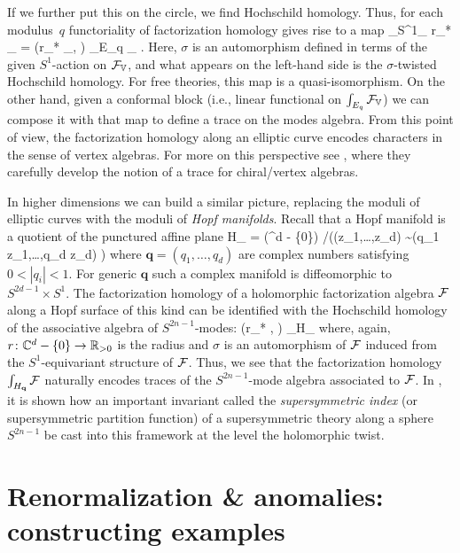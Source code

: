 \documentclass[11pt]{amsart}
\renewcommand{\op}{\operatorname}
\begin{document}
If we further put this on the circle, we find Hochschild homology.
Thus, for each modulus~$q$ functoriality of factorization homology gives rise to a map
\beqn
\int_{S^1_{\sigma}} r_* \cF_{} = \op{Hoch}(r_* \cF_{}, \sigma) \to \int_{E_q} \cF_{} .
\eeqn
Here, $\sigma$ is an automorphism defined in terms of the given $S^1$-action on $\mathcal F_{\mathbb{V}}$, and what appears on the left-hand side is the $\sigma$-twisted Hochschild homology.
For free theories, this map is a quasi-isomorphism.
On the other hand, given a conformal block (i.e., linear functional on $\int_{E_q} \mathcal F_{\mathbb{V}}$) we can compose it with that map to define a trace on the modes algebra.
From this point of view, the factorization homology along an elliptic curve encodes characters in the sense of vertex algebras.
For more on this perspective see \cite{GuiLi}, where they carefully develop the notion of a trace for chiral/vertex algebras.

In higher dimensions we can build a similar picture,
replacing the moduli of elliptic curves with the moduli of {\it Hopf manifolds}.
Recall that a Hopf manifold is a quotient of the punctured affine plane
\beqn
H_{} = \left(\C^d - \{0\}\right) \slash \left((z_1,\ldots,z_d) \sim (q_1 z_1,\ldots,q_d z_d) \right)
\eeqn
where $\mathbf{q} = (q_1,\ldots,q_d)$ are complex numbers satisfying $0 < |q_i| < 1$.
For generic $\mathbf{q}$ such a complex manifold is diffeomorphic to $S^{2d-1} \times S^1$.
The factorization homology of a holomorphic factorization algebra $\mathcal F$ along a Hopf surface of this kind can be identified with the Hochschild homology of the associative algebra of $S^{2n-1}$-modes:
\beqn
\op{Hoch}(r_* \cF , \sigma) \to \int_{H_{}} \cF 
\eeqn
where, again, $r\colon {\mathbb{C}}^d - \{0\} \to \mathbb R_{>0}$ is the radius and $\sigma$ is an automorphism of $\mathcal F$ induced from the $S^1$-equivariant structure of $\mathcal F$.
Thus, we see that the factorization homology $\int_{H_{\mathbf{q}}} \mathcal F$ naturally encodes traces of the $S^{2n-1}$-mode algebra associated to $\mathcal F$.
In \cite{SWchar}, it is shown how an important invariant called the \textit{supersymmetric index} (or supersymmetric partition function) of a supersymmetric theory along a sphere $S^{2n-1}$ be cast into this framework at the level the holomorphic twist.

\section{Renormalization \& anomalies: constructing examples}
\label{sec: renorm}
\end{document}
